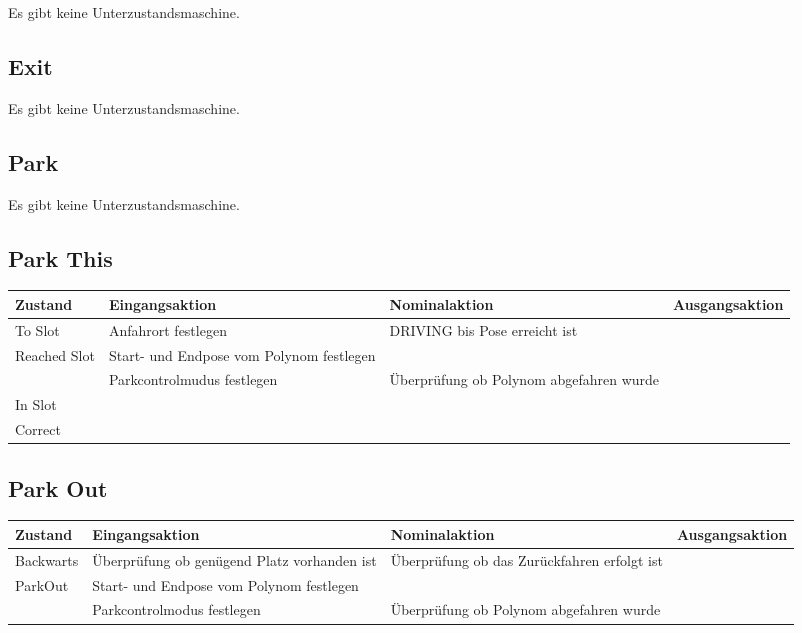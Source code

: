 Es gibt keine Unterzustandsmaschine.

\subsection{Exit}

Es gibt keine Unterzustandsmaschine.

\subsection{Park}

Es gibt keine Unterzustandsmaschine.

\subsection{Park This}

\begin{tabular}{|p{1.5cm}|p{4cm}|p{4cm}|p{3cm}|}
	\hline 
	Zustand & Eingangsaktion & Nominalaktion & Ausgangsaktion \\ 
	\hline 
	To Slot & Anfahrort festlegen & DRIVING bis Pose erreicht ist &  \\ 
	\hline 
	Reached Slot & Start- und Endpose vom Polynom festlegen &  &  \\ 
	\hline 
	 & Parkcontrolmudus festlegen & Überprüfung ob Polynom abgefahren wurde &  \\ 
	\hline
	In Slot &  &  &  \\ 
	\hline 
	Correct &  &  &  \\ 
	\hline
\end{tabular} 

\subsection{Park Out}

\begin{tabular}{|p{1.5cm}|p{4cm}|p{4cm}|p{3cm}|}
	\hline 
	Zustand & Eingangsaktion & Nominalaktion & Ausgangsaktion \\ 
	\hline 
	Backwarts & Überprüfung ob genügend Platz vorhanden ist & Überprüfung ob das Zurückfahren erfolgt ist &  \\ 
	\hline 
	ParkOut & Start- und Endpose vom Polynom festlegen  &  &  \\ 
	\hline  
	& Parkcontrolmodus festlegen & Überprüfung ob Polynom abgefahren wurde &  \\ 
	\hline
 
\end{tabular} 